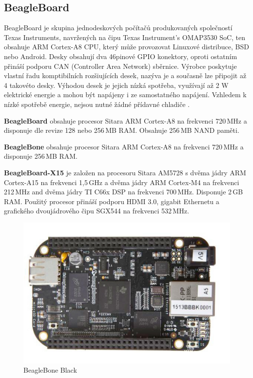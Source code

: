 	
\subsection{BeagleBoard }
BeagleBoard je skupina jednodeskových počítačů produkovaných společností Texas Instruments, navržených na čipu Texas Instrument's OMAP3530 SoC, ten obsahuje ARM Cortex-A8 CPU, který může provozovat Linuxové distribuce, BSD nebo Android. Desky obsahují dva 46pinové GPIO konektory, oproti ostatním přináší podporu CAN (Controller Area Network) sběrnice. Výrobce poskytuje vlastní řadu komptibilních rozšiujících desek, nazýva je  a současně lze připojit až 4 takovéto desky. Výhodou desek je jejich nízká spotřeba, využívají až 2 W elektrické energie a mohou být napájeny i ze samostatného napájení. Vzhledem k nízké spotřebě energie, nejsou nutné žádné přídavné chladiče \cite{BeagleBone}.

\textbf{BeagleBoard} obsahuje procesor Sitara ARM Cortex-A8 na frekvenci 720\,MHz a disponuje dle revize 128 nebo 256\,MB RAM. Obsahuje 256\,MB NAND paměti.

\textbf{BeagleBone} obsahuje procesor Sitara ARM Cortex-A8 na frekvenci 720\,MHz a disponuje 256\,MB RAM.

\textbf{BeagleBoard-X15} je založen na procesoru Sitara AM5728 s dvěma jádry ARM Cortex-A15 na frekvenci 1,5\,GHz a dvěma jádry ARM Cortex-M4 na frekvenci 212\,MHz and dvěma jádry TI C66x DSP na frekvenci 700\,MHz. Disponuje 2\,GB RAM. Použitý procesor přináší podporu HDMI 3.0, gigabit Ethernetu a grafického dvoujádrového čipu SGX544 na frekvenci 532\,MHz. 

\newpage

	\begin{figure}[!h]
  \begin{center}
    \includegraphics[scale=0.8]{obrazky/embed_beaglebone_black}
  \end{center}
  \caption{BeagleBone Black \cite{BeagleBone}}
\end{figure}

